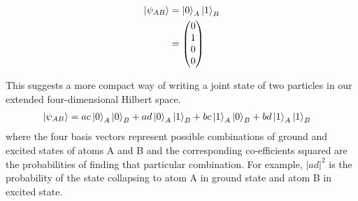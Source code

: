 \begin{align*}
  \ket{\psi_{AB}} &= \ket{0}_A \ket{1}_B \\
                  &= \begin{pmatrix} 0 \\ 1 \\ 0 \\ 0 \end{pmatrix}
\end{align*}
\par This suggests a more compact way of writing a joint state of two particles in our extended four-dimensional Hilbert space.
\begin{align*}
  \ket{\psi_{AB}} &= ac \ket{0}_A \ket{0}_B + ad \ket{0}_A \ket{1}_B + bc \ket{1}_A \ket{0}_B + bd \ket{1}_A \ket{1}_B 
\end{align*}
where the four basis vectors represent possible combinations of ground and excited states of atoms A and B and the corresponding co-efficients squared are the probabilities of finding that particular combination. For example, $|ad|^2$ is the probability of the state collapsing to atom A in ground state and atom B in excited state. 


